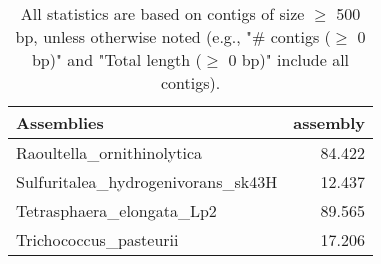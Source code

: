 \documentclass[12pt,a4paper]{article}
\begin{document}
\begin{table}[ht]
\begin{center}
\caption{All statistics are based on contigs of size $\geq$ 500 bp, unless otherwise noted (e.g., "\# contigs ($\geq$ 0 bp)" and "Total length ($\geq$ 0 bp)" include all contigs).}
\begin{tabular}{|l*{1}{|r}|}
\hline
Assemblies & assembly \\ \hline
Raoultella\_ornithinolytica & 84.422 \\ \hline
Sulfuritalea\_hydrogenivorans\_sk43H & 12.437 \\ \hline
Tetrasphaera\_elongata\_Lp2 & 89.565 \\ \hline
Trichococcus\_pasteurii & 17.206 \\ \hline
\end{tabular}
\end{center}
\end{table}
\end{document}
